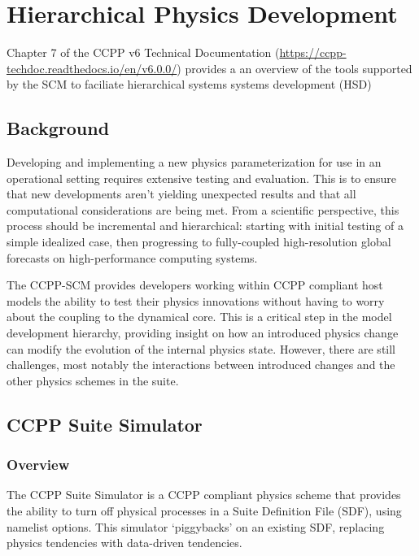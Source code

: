 \chapter{Hierarchical Physics Development}
\label{chapter: Hierarchical_Physics_Development}

Chapter 7 of the CCPP v6 Technical Documentation (\url{https://ccpp-techdoc.readthedocs.io/en/v6.0.0/}) provides a an overview of the tools supported by the SCM to faciliate hierarchical systems systems development (HSD)

\section{Background}

Developing and implementing a new physics parameterization for use in an operational setting requires extensive testing and evaluation. This is to ensure that new developments aren’t yielding unexpected results and that all computational considerations are being met. From a scientific perspective, this process should be incremental and hierarchical: starting with initial testing of a simple idealized case, then progressing to fully-coupled high-resolution global forecasts on high-performance computing systems.


The CCPP-SCM provides developers working within CCPP compliant host models the ability to test their physics innovations without having to worry about the coupling to the dynamical core. This is a critical step in the model development hierarchy, providing insight on how an introduced physics change can modify the evolution of the internal physics state. However, there are still challenges, most notably the interactions between introduced changes and the other physics schemes in the suite.

\section{CCPP Suite Simulator}

\subsection{Overview}

The CCPP Suite Simulator is a CCPP compliant physics scheme that provides the ability to turn off physical processes in a Suite Definition File (SDF), using namelist options. This simulator `piggybacks' on an existing SDF, replacing physics tendencies with data-driven tendencies. 

